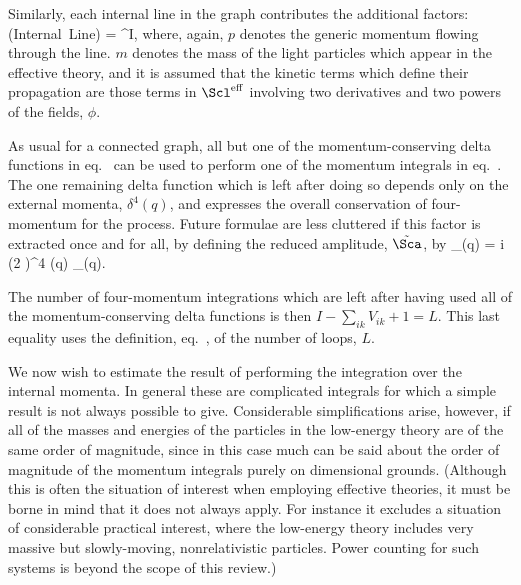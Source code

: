 \documentclass[12pt]{report}
\def\leff{\Scl^{\rm eff}}
\begin{document}
Similarly, each internal line in the graph contributes the
additional factors:
%
\eq
\label{internallinecont}
\hbox{(Internal Line)} = ^I,
\eeq
%
where, again, $p$ denotes the generic momentum flowing
through the line. $m$ denotes the mass of the light
particles which appear in the effective theory, and it is
assumed that the kinetic terms which define their
propagation are those terms in $\leff$ involving two
derivatives and two powers of the fields, $\phi$.

As usual for a connected graph, all but one of the
momentum-conserving delta functions in
eq.~ can be used to perform one of the
momentum integrals in 
eq.~. The one remaining delta
function which is left after doing so depends only on the
external momenta, $\delta^4(q)$, and expresses the overall
conservation of four-momentum for the process. Future
formulae are less cluttered if this factor is extracted
once and for all, by defining the reduced amplitude,
$\tilde \Sca$, by
%
\eq
\label{redampdef}
\Sca_\sse(q) = i (2 \pi)^4 \delta(q) \; \tilde\Sca_\sse(q).
\eeq

The number of four-momentum integrations which are left
after having used all of the momentum-conserving delta
functions is then $I - \sum_{ik} V_{ik} + 1 = L$. This last
equality uses the definition, eq.~, of the
number of loops, $L$.

We now wish to estimate the result of performing the
integration over the internal momenta. In general these
are complicated integrals for which a simple result is not
always possible to give. Considerable simplifications arise,
however, if all of the masses and energies of the
particles in the low-energy theory are of the same order
of magnitude, since in this case much can be said about
the order of magnitude of the momentum integrals purely on 
dimensional grounds. (Although this is often the situation
of interest when employing effective theories, it must be
borne in mind that it does not always apply. For instance
it excludes a situation of considerable practical interest, 
where the low-energy theory includes very massive but 
slowly-moving, nonrelativistic particles. Power counting
for such systems is beyond the scope of this review.)
\end{document}
